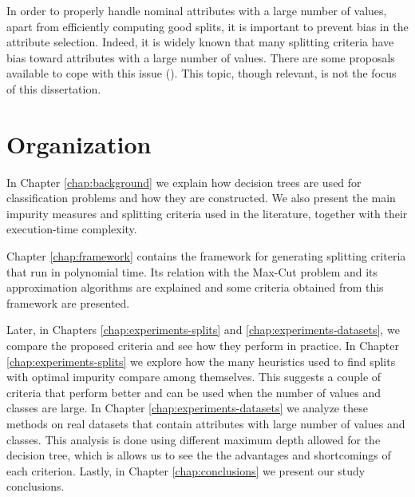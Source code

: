 In order to properly
handle nominal attributes with a large number of values,
apart from efficiently computing good splits, it is
important to prevent bias in the attribute selection.
Indeed, it is widely  known that many splitting criteria have bias toward
attributes with a large number of values. There are some  proposals available
to cope with this issue 
(\cite{conf/icml/DobraG01,Shih2004,Hothorn:2006:URP}). 
This topic, though relevant, is not the focus of this dissertation.

\section{Organization}
\label{sec:organization}
In Chapter \ref{chap:background} we explain how decision trees are used for classification problems and how they are constructed. We also present the main impurity measures and splitting criteria used in the literature, together with their execution-time complexity.

Chapter \ref{chap:framework} contains the framework for generating splitting criteria that run in polynomial time. Its relation with the Max-Cut problem and its approximation algorithms are explained and some criteria obtained from this framework are presented.

Later, in Chapters \ref{chap:experiments-splits} and \ref{chap:experiments-datasets}, we compare the proposed criteria and see how they perform in practice. In Chapter \ref{chap:experiments-splits} we explore how the many heuristics used to find splits with optimal impurity compare among themselves. This suggests a couple of criteria that perform better and can be used when the number of values and classes are large. In Chapter \ref{chap:experiments-datasets} we analyze these methods on real datasets that contain attributes with large number of values and classes. This analysis is done using different maximum depth allowed for the decision tree, which is allows us to see the the advantages and shortcomings of each criterion. Lastly, in Chapter \ref{chap:conclusions} we present our study conclusions.


